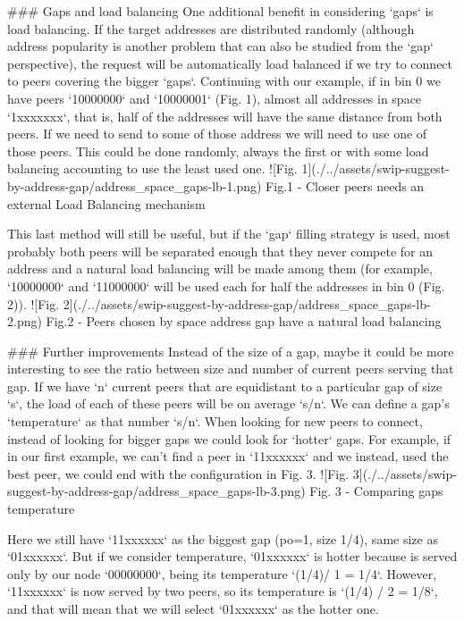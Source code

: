 ### Gaps and load balancing
One additional benefit in considering `gaps` is load balancing. If the target addresses are distributed randomly 
(although address popularity is another problem that can also be studied from the `gap` perspective), the request will
be automatically load balanced if we try to connect to peers covering the bigger `gaps`. Continuing with our example,
if in bin 0 we have peers `10000000` and `10000001` (Fig. 1), almost all addresses in space `1xxxxxxx`, that is, half of the 
addresses will have the same distance from both peers. If we need to send to some of those address we will need to use
one of those peers. This could be done randomly, always the first or with some load balancing accounting to use the least
used one. 
![Fig. 1](./../assets/swip-suggest-by-address-gap/address_space_gaps-lb-1.png)
Fig.1 - Closer peers needs an external Load Balancing mechanism

This last method will still be useful, but if the `gap` filling strategy is used, most probably both peers will
be separated enough that they never compete for an address and a natural load balancing will be made among them (for example,
`10000000` and `11000000` will be used each for half the addresses in bin 0 (Fig. 2)).
![Fig. 2](./../assets/swip-suggest-by-address-gap/address_space_gaps-lb-2.png)
Fig.2 - Peers chosen by space address gap have a natural load balancing

### Further improvements
 Instead of the size of a gap, maybe it could be more interesting to see the ratio between size and number of current 
 peers serving that gap. If we have `n` current peers that are equidistant to a particular gap of size `s`,
the load of each of these peers will be on average `s/n`. 
We can define a gap's `temperature` as that number `s/n`. When looking for new peers to connect, instead of looking for
bigger gaps we could look for `hotter` gaps.
For example, if in our first example, we can't find a peer in `11xxxxxx` and we instead, used the best peer, we could end
with the configuration in Fig. 3.
![Fig. 3](./../assets/swip-suggest-by-address-gap/address_space_gaps-lb-3.png)
Fig. 3 - Comparing gaps temperature

Here we still have `11xxxxxx` as the biggest gap (po=1, size 1/4), same size as `01xxxxxx`. But if we consider temperature,
`01xxxxxx` is hotter because is served only by our node `00000000`, being its temperature  `(1/4)/ 1 = 1/4`. However,
`11xxxxxx` is now served by two peers, so its temperature is `(1/4) / 2 = 1/8`, and that will mean that we will select
`01xxxxxx` as the hotter one.

